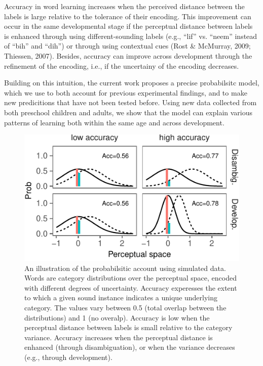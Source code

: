 \documentclass[10pt, letterpaper]{article}
\newenvironment{CodeChunk}{}{}
\begin{document}
Accuracy in word learning increases when the perceived distance between
the labels is large relative to the tolerance of their encoding. This
improvement can occur in the same developmental stage if the perceptual
distance between labels is enhanced through using different-sounding
labels (e.g., ``lif'' vs. ``neem'' instead of ``bih'' and ``dih'') or
through using contextual cues (Rost \& McMurray, 2009; Thiessen, 2007).
Besides, accuracy can improve across development through the refinement
of the encoding, i.e., if the uncertainy of the encoding decreases.

Building on this intuition, the current work proposes a precise
probabilsitc model, which we use to both account for previous
experimental findings, and to make new predicitions that have not been
tested before. Using new data collected from both preschool children and
adults, we show that the model can explain various patterns of learning
both within the same age and across development.

\begin{CodeChunk}
\begin{figure}[H]

{\centering \includegraphics{figs/illus-1} 

}

\caption{\label{fig:illus} An illustration of the probabilsitic account using simulated data. Words are category distributions over the perceptual space, encoded with different degrees of uncertainty. Accuracy experesses the extent to which a given sound instance indicates a unique underlying category. The values vary between 0.5 (total overlap between the distributions) and 1 (no overalp). Accuracy is low when the perceptual distance between labels is small relative to the category variance. Accuracy increases when the perceptual distance is enhanced (through disambiguation), or when the variance decreases (e.g., through development).}\label{fig:illus}
\end{figure}
\end{CodeChunk}
\end{document}
